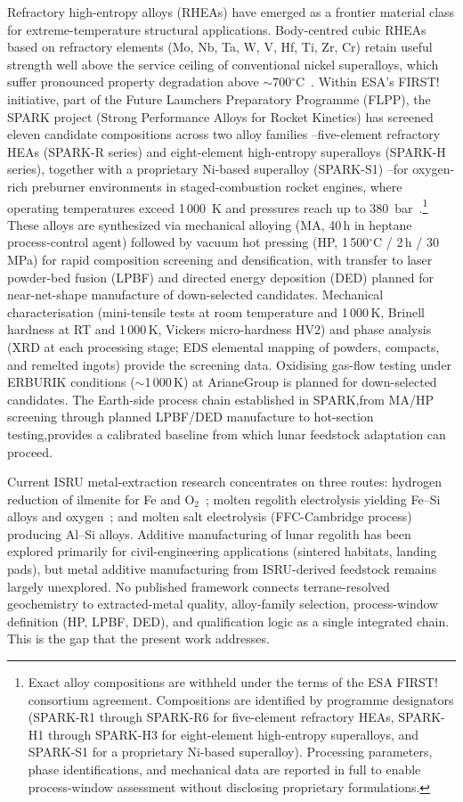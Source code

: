 \documentclass[11pt,a4paper]{article}
\begin{document}
Refractory high-entropy alloys (RHEAs) have emerged as a frontier material class for extreme-temperature structural applications. Body-centred cubic RHEAs based on refractory elements (Mo, Nb, Ta, W, V, Hf, Ti, Zr, Cr) retain useful strength well above the service ceiling of conventional nickel superalloys, which suffer pronounced property degradation above $\sim$700$^\circ$C~\cite{Senkov2018,George2019,Miracle2017}. Within ESA's FIRST! initiative, part of the Future Launchers Preparatory Programme (FLPP), the SPARK project (Strong Performance Alloys for Rocket Kinetics) has screened eleven candidate compositions across two alloy families --five-element refractory HEAs (SPARK-R series) and eight-element high-entropy superalloys (SPARK-H series), together with a proprietary Ni-based superalloy (SPARK-S1) --for oxygen-rich preburner environments in staged-combustion rocket engines, where operating temperatures exceed 1\,000~K and pressures reach up to 380~bar~\cite{Alvi2022}.\footnote{Exact alloy compositions are withheld under the terms of the ESA FIRST! consortium agreement. Compositions are identified by programme designators (SPARK-R1 through SPARK-R6 for five-element refractory HEAs, SPARK-H1 through SPARK-H3 for eight-element high-entropy superalloys, and SPARK-S1 for a proprietary Ni-based superalloy). Processing parameters, phase identifications, and mechanical data are reported in full to enable process-window assessment without disclosing proprietary formulations.} These alloys are synthesized via mechanical alloying (MA, 40\,h in heptane process-control agent) followed by vacuum hot pressing (HP, 1\,500$^\circ$C / 2\,h / 30\,MPa) for rapid composition screening and densification, with transfer to laser powder-bed fusion (LPBF) and directed energy deposition (DED) planned for near-net-shape manufacture of down-selected candidates. Mechanical characterisation (mini-tensile tests at room temperature and 1\,000\,K, Brinell hardness at RT and 1\,000\,K, Vickers micro-hardness HV2) and phase analysis (XRD at each processing stage; EDS elemental mapping of powders, compacts, and remelted ingots) provide the screening data. Oxidising gas-flow testing under ERBURIK conditions ($\sim$1\,000\,K) at ArianeGroup is planned for down-selected candidates. The Earth-side process chain established in SPARK,from MA/HP screening through planned LPBF/DED manufacture to hot-section testing,provides a calibrated baseline from which lunar feedstock adaptation can proceed.

Current ISRU metal-extraction research concentrates on three routes: hydrogen reduction of ilmenite for Fe and O$_2$~\cite{Anand2012}; molten regolith electrolysis yielding Fe--Si alloys and oxygen~\cite{Sanders2025}; and molten salt electrolysis (FFC-Cambridge process) producing Al--Si alloys. Additive manufacturing of lunar regolith has been explored primarily for civil-engineering applications (sintered habitats, landing pads), but metal additive manufacturing from ISRU-derived feedstock remains largely unexplored. No published framework connects terrane-resolved geochemistry to extracted-metal quality, alloy-family selection, process-window definition (HP, LPBF, DED), and qualification logic as a single integrated chain. This is the gap that the present work addresses.
\end{document}
